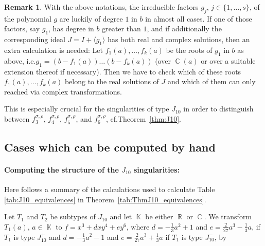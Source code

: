 \documentclass[noend]{amsproc}
\theoremstyle{definition}
\newtheorem{remark}[theorem]{Remark}
\DeclareMathOperator{\R}{\mathbb{R}}
\DeclareMathOperator{\C}{\mathbb{C}}
\DeclareMathOperator{\K}{\mathbb{K}}
\begin{document}
\begin{remark}
With the above notations, the irreducible factors $g_j$,
$j \in \{1,\ldots,s\}$, of the polynomial $g$ are luckily of degree $1$ in $b$
in almost all cases. If one of those factors, say $g_1$, has degree in $b$
greater than $1$, and if additionally the corresponding ideal $J = I + \langle
g_1 \rangle$ has both real and complex solutions, then an extra calculation is
needed: Let $f_1(a), \ldots, f_k(a)$ be the roots of $g_1$ in $b$ as above,
i.e.\@ $g_1 = (b-f_1(a)) \ldots (b-f_k(a))$ (over $\C(a)$ or over a suitable
extension thereof if necessary). Then we have to check which of these roots
$f_1(a), \ldots, f_k(a)$ belong to the real solutions of $J$ and which of them
can only reached via complex transformations.

This is especially crucial for the singularities of type $J_{10}$ in order to
distinguish between $f_3^{\sigma,\rho}$, $f_4^{\sigma,\rho}$,
$f_5^{\sigma,\rho}$, and $f_6^{\sigma,\rho}$, cf.\@ Theorem~\ref{thm:J10}.
\end{remark}


\subsection{Cases which can be computed by hand}

\paragraph{\bf Computing the structure of the $J_{10}$ singularities:}Here follows a summary of the calculations used to calculate Table \ref{tab:J10_equivalences} in Theorem~\ref{tab:ThmJ10_equivalences}.

Let $T_1$ and $T_2$ be subtypes of $J_{10}$ and let $\K$ be either $\R$ or $\C$.  We transform $T_1(a)$, $a\in\K$ to  $f=x^3+dxy^4+ey^6$, where $d=-\frac{1}{3}a^2+1$ and $e=\frac{2}{27}a^3-\frac{1}{3}a$, if $T_1$ is type $J_{10}^+$ and $d=-\frac{1}{3}a^2-1$ and $e=\frac{2}{27}a^3+\frac{1}{3}a$ if $T_1$ is type $J_{10}^-$, by 
\end{document}
